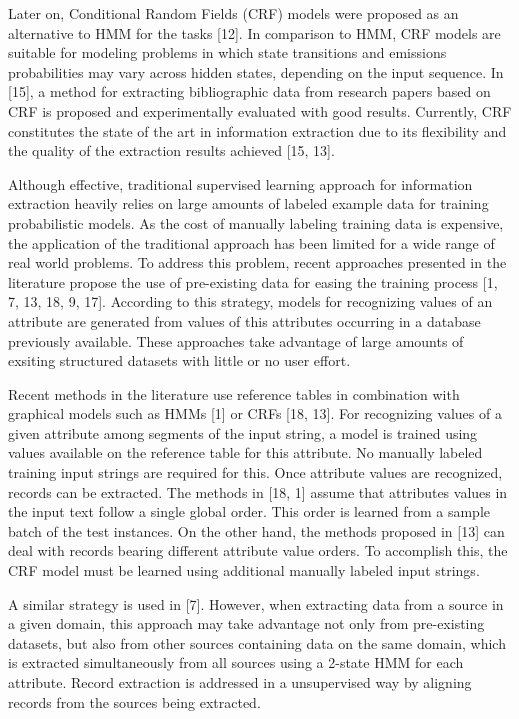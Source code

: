 \documentclass{sig-alternate}
\begin{document}
Later on, Conditional Random Fields (CRF) models were proposed as an alternative to HMM for the tasks [12]. 
In comparison to HMM, CRF models are suitable for modeling problems in which state transitions and emissions probabilities 
may vary across hidden states, depending on the input sequence. In [15], a method for extracting bibliographic data from 
research papers based on CRF is proposed and experimentally evaluated with good results. Currently, CRF constitutes the state 
of the art in information extraction due to its flexibility and the quality of the extraction results achieved [15, 13]. 

Although effective, traditional supervised learning approach for information extraction heavily relies on large amounts of 
labeled example data for training probabilistic models. As the cost of manually labeling training data is expensive, the 
application of the traditional approach has been limited for a wide range of real world problems. To address this problem, 
recent approaches presented in the literature propose the use of pre-existing data for easing the training 
process [1, 7, 13, 18, 9, 17]. According to this strategy, models for recognizing values of an attribute are generated 
from values of this attributes occurring in a database previously available. These approaches take advantage of large 
amounts of exsiting structured datasets with little or no user effort. 

Recent methods in the literature use reference tables in combination with graphical models such as HMMs [1] or 
CRFs [18, 13]. For recognizing values of a given attribute among segments of the input string, a model is trained using 
values available on the reference table for this attribute. No manually labeled training input strings are required for this. 
Once attribute values are recognized, records can be extracted. The methods in [18, 1] assume that attributes values in 
the input text follow a single global order. This order is learned from a sample batch of the test instances. 
On the other hand, the methods proposed in [13] can deal with records bearing different attribute value orders. 
To accomplish this, the CRF model must be learned using additional manually labeled input strings. 

A similar strategy is used in [7]. However, when extracting data from a source in a given domain, this approach may 
take advantage not only from pre-existing datasets, but also from other sources containing data on the same domain, 
which is extracted simultaneously from all sources using a 2-state HMM for each attribute. Record extraction is addressed 
in a unsupervised way by aligning records from the sources being extracted. 
\end{document}
